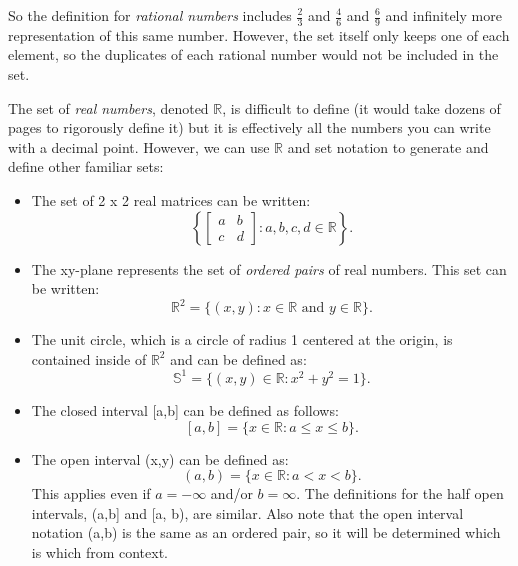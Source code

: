 \documentclass{amsart} %
\theoremstyle{definition} %
\theoremstyle{definition}
\theoremstyle{remark} %
\begin{document}
So the definition for \emph{rational numbers} includes $\frac{2}{3}$ and $\frac{4}{6}$ and $\frac{6}{9}$ and infinitely more representation of this same number. However, the set itself only keeps one of each element, so the duplicates of each rational number would not be included in the set.

\medskip
\noindent {} \quad The set of \emph{real numbers}, denoted $\mathbb{R}$, is difficult to define (it would take dozens of pages to rigorously define it) but it is effectively all the numbers you can write with a decimal point. However, we can use $\mathbb{R}$ and set notation to generate and define other familiar sets:

    \begin{itemize}
      \item The set of 2 x 2 real matrices can be written:
            $$ \left\{\begin{bmatrix}
                  a & b \\
                  c & d
                \end{bmatrix} : a, b, c, d \in \mathbb{R}\right\}. $$ %
      \item The xy-plane represents the set of \emph{ordered pairs} of real numbers. This set can be written:
            \[ \mathbb{R}^2 = \{(x,y) : x \in \mathbb{R} \text{ and } y \in \mathbb{R}\}. \]
      \item The unit circle, which is a circle of radius 1 centered at the origin, is contained inside of $\mathbb{R}^2$ and can be defined as:
            \[ \mathbb{S}^1 = \{(x,y) \in \mathbb{R} : x^2 + y^2 = 1\}.  \]
      \item The closed interval [a,b] can be defined as follows:
            \[ [a,b] = \{x \in \mathbb{R} : a \le x \le b\}.  \]
      \item The open interval (x,y) can be defined as:
            \[ (a,b) = \{x \in \mathbb{R} : a < x < b\}. \]
            This applies even if $a = -\infty$ and/or $b = \infty$. The definitions for the half open intervals, (a,b] and [a, b), are similar. Also note that the           open interval notation (a,b) is the same as an ordered pair, so it will be determined which is which from context.
    \end{itemize}
\end{document}
